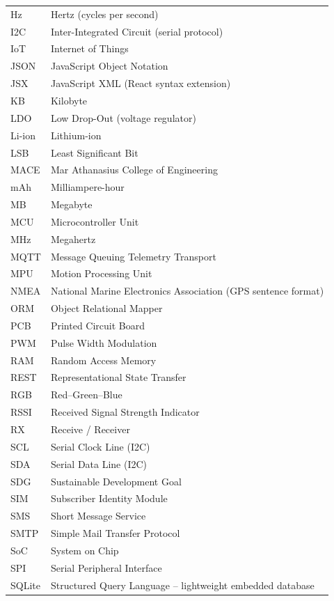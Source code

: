 \begin{longtable}{p{3.2cm} p{10cm}}
Hz    & Hertz (cycles per second) \\
I2C   & Inter-Integrated Circuit (serial protocol) \\
IoT   & Internet of Things \\
JSON  & JavaScript Object Notation \\
JSX   & JavaScript XML (React syntax extension) \\
KB    & Kilobyte \\
LDO   & Low Drop-Out (voltage regulator) \\
Li-ion & Lithium-ion \\
LSB   & Least Significant Bit \\
MACE  & Mar Athanasius College of Engineering \\
mAh   & Milliampere-hour \\
MB    & Megabyte \\
MCU   & Microcontroller Unit \\
MHz   & Megahertz \\
MQTT  & Message Queuing Telemetry Transport \\
MPU   & Motion Processing Unit \\
NMEA  & National Marine Electronics Association (GPS sentence format) \\
ORM   & Object Relational Mapper \\
PCB   & Printed Circuit Board \\
PWM   & Pulse Width Modulation \\
RAM   & Random Access Memory \\
REST  & Representational State Transfer \\
RGB   & Red–Green–Blue \\
RSSI  & Received Signal Strength Indicator \\
RX    & Receive / Receiver \\
SCL   & Serial Clock Line (I2C) \\
SDA   & Serial Data Line (I2C) \\
SDG   & Sustainable Development Goal \\
SIM   & Subscriber Identity Module \\
SMS   & Short Message Service \\
SMTP  & Simple Mail Transfer Protocol \\
SoC   & System on Chip \\
SPI   & Serial Peripheral Interface \\
SQLite & Structured Query Language – lightweight embedded database \\

\end{longtable}
